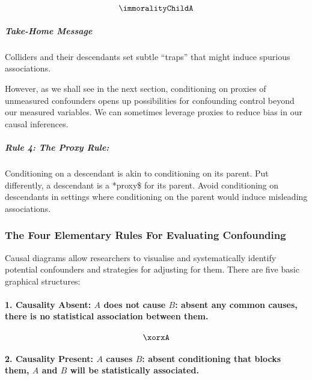 \documentclass[
  singlecolumn]{article}
\let\oldparagraph\paragraph
\renewcommand{\paragraph}[1]{\oldparagraph{#1}\mbox{}}
\let\oldsubparagraph\subparagraph
\renewcommand{\subparagraph}[1]{\oldsubparagraph{#1}\mbox{}}
\begin{document}
\[\immoralityChildA\]

\subparagraph{\texorpdfstring{\textbf{Take-Home
Message}}{Take-Home Message}}\label{take-home-message-1}

Colliders and their descendants set subtle ``traps'' that might induce
spurious associations.

However, as we shall see in the next section, conditioning on proxies of
unmeasured confounders opens up possibilities for confounding control
beyond our measured variables. We can sometimes leverage proxies to
reduce bias in our causal inferences.

\subparagraph{\texorpdfstring{\textbf{Rule 4: The Proxy
Rule:}}{Rule 4: The Proxy Rule:}}\label{rule-4-the-proxy-rule}

Conditioning on a descendant is akin to conditioning on its parent. Put
differently, a descendant is a *proxy\$ for its parent. Avoid
conditioning on descendants in settings where conditioning on the parent
would induce misleading associations.

\subsubsection{The Four Elementary Rules For Evaluating
Confounding}\label{sec-four-rules}

Causal diagrams allow researchers to visualise and systematically
identify potential confounders and strategies for adjusting for them.
There are five basic graphical structures:

\paragraph{\texorpdfstring{1. \textbf{Causality Absent:} \(A\) does not
cause \(B\): absent any common causes, there is no statistical
association between
them.}{1. Causality Absent: A does not cause B: absent any common causes, there is no statistical association between them.}}\label{causality-absent-a-does-not-cause-b-absent-any-common-causes-there-is-no-statistical-association-between-them.}

\[\xorxA\]

\paragraph{\texorpdfstring{2. \textbf{Causality Present:} \(A\) causes
\(B\): absent conditioning that blocks them, \(A\) and \(B\) will be
statistically
associated.}{2. Causality Present: A causes B: absent conditioning that blocks them, A and B will be statistically associated.}}\label{causality-present-a-causes-b-absent-conditioning-that-blocks-them-a-and-b-will-be-statistically-associated.}
\end{document}
